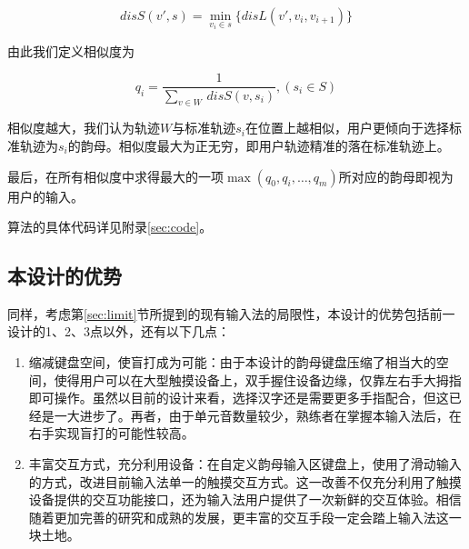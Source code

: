   \[disS(v', s) = \min_{v_i \in s }\{disL(v', v_i, v_{i+1})\}\]

  由此我们定义相似度为

  \[q_i = \frac{1}{\sum_{v \in W}\,disS(v, s_i)}, (s_i \in S)\]

  相似度越大，我们认为轨迹\(W\)与标准轨迹\(s_i\)在位置上越相似，用户更倾向于选择标准轨迹为\(s_i\)的韵母。相似度最大为正无穷，即用户轨迹精准的落在标准轨迹上。

  最后，在所有相似度中求得最大的一项\(\max(q_0, q_i, \dots, q_m)\)所对应的韵母即视为用户的输入。

  算法的具体代码详见附录\ref{sec:code}。

  \subsection{本设计的优势}

  同样，考虑第\ref{sec:limit}节所提到的现有输入法的局限性，本设计的优势包括前一设计的1、2、3点以外，还有以下几点：

  \begin{enumerate}
  \item
  缩减键盘空间，使盲打成为可能：由于本设计的韵母键盘压缩了相当大的空间，使得用户可以在大型触摸设备上，双手握住设备边缘，仅靠左右手大拇指即可操作。虽然以目前的设计来看，选择汉字还是需要更多手指配合，但这已经是一大进步了。再者，由于单元音数量较少，熟练者在掌握本输入法后，在右手实现盲打的可能性较高。

  \item
  丰富交互方式，充分利用设备：在自定义韵母输入区键盘上，使用了滑动输入的方式，改进目前输入法单一的触摸交互方式。这一改善不仅充分利用了触摸设备提供的交互功能接口，还为输入法用户提供了一次新鲜的交互体验。相信随着更加完善的研究和成熟的发展，更丰富的交互手段一定会踏上输入法这一块土地。

  \end{enumerate}
